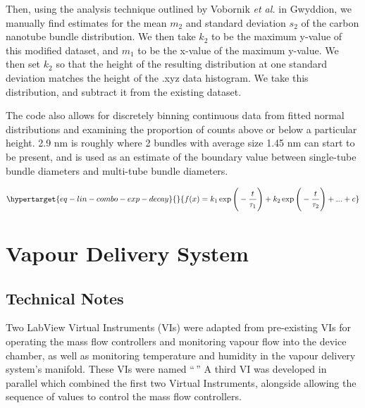 \documentclass[
  a4paper,
]{scrbook}
\begin{document}
Then, using the analysis technique outlined by Vobornik \emph{et al.}
\autocite{Vobornik2023} in Gwyddion, we manually find estimates for the
mean \(m_2\) and standard deviation \(s_2\) of the carbon nanotube
bundle distribution. We then take \(k_2\) to be the maximum y-value of
this modified dataset, and \(m_1\) to be the x-value of the maximum
y-value. We then set \(k_2\) so that the height of the resulting
distribution at one standard deviation matches the height of the .xyz
data histogram. We take this distribution, and subtract it from the
existing dataset.

The code also allows for discretely binning continuous data from fitted
normal distributions and examining the proportion of counts above or
below a particular height. 2.9 nm is roughly where 2 bundles with
average size 1.45 nm can start to be present, and is used as an estimate
of the boundary value between single-tube bundle diameters and
multi-tube bundle diameters.

\begin{equation}\protect\hypertarget{eq-lin-combo-exp-decay}{}{
f(x) = k_1\exp{\Bigg(-\frac{t}{{\tau}_{1}}\Bigg)} + k_2\exp{\Bigg(-\frac{t}{{\tau}_{2}}\Bigg)} + ... + c
}\label{eq-lin-combo-exp-decay}\end{equation}

\hypertarget{vapour-delivery-system}{%
\chapter{Vapour Delivery System}\label{vapour-delivery-system}}

\hypertarget{technical-notes}{%
\section{Technical Notes}\label{technical-notes}}

Two LabView Virtual Instruments (VIs) were adapted from pre-existing VIs
for operating the mass flow controllers and monitoring vapour flow into
the device chamber, as well as monitoring temperature and humidity in
the vapour delivery system's manifold. These VIs were named ``\,'' A
third VI was developed in parallel which combined the first two Virtual
Instruments, alongside allowing the sequence of values to control the
mass flow controllers.
\end{document}
